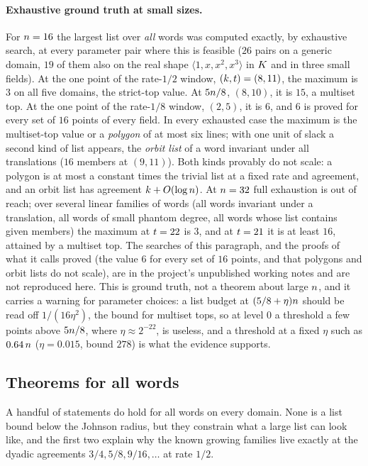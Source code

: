 \paragraph{Exhaustive ground truth at small sizes.} For $n=16$ the largest list over \emph{all} words was computed exactly, by exhaustive search, at every parameter pair where this is feasible ($26$ pairs on a generic domain, $19$ of them also on the real shape $\langle1,x,x^2,x^3\rangle$ in $K$ and in three small fields). At the one point of the rate-$1/2$ window, $(k,t)=(8,11)$, the maximum is $3$ on all five domains, the strict-top value. At $5n/8$, $(8,10)$, it is $15$, a multiset top. At the one point of the rate-$1/8$ window, $(2,5)$, it is $6$, and $6$ is proved for every set of $16$ points of every field. In every exhausted case the maximum is the multiset-top value or a \emph{polygon} of at most six lines; with one unit of slack a second kind of list appears, the \emph{orbit list} of a word invariant under all translations ($16$ members at $(9,11)$). Both kinds provably do not scale: a polygon is at most a constant times the trivial list at a fixed rate and agreement, and an orbit list has agreement $k+O(\log n)$. At $n=32$ full exhaustion is out of reach; over several linear families of words (all words invariant under a translation, all words of small phantom degree, all words whose list contains given members) the maximum at $t=22$ is $3$, and at $t=21$ it is at least $16$, attained by a multiset top. The searches of this paragraph, and the proofs of what it calls proved (the value $6$ for every set of $16$ points, and that polygons and orbit lists do not scale), are in the project's unpublished working notes and are not reproduced here. This is ground truth, not a theorem about large $n$, and it carries a warning for parameter choices: a list budget at $(5/8+\eta)n$ should be read off $1/(16\eta^2)$, the bound for multiset tops, so at level $0$ a threshold a few points above $5n/8$, where $\eta\approx2^{-22}$, is useless, and a threshold at a fixed $\eta$ such as $0.64\,n$ ($\eta=0.015$, bound $278$) is what the evidence supports.

\subsection{Theorems for all words}\label{sec:allwords}

A handful of statements do hold for all words on every domain. None is a list bound below the Johnson radius, but they constrain what a large list can look like, and the first two explain why the known growing families live exactly at the dyadic agreements $3/4,5/8,9/16,\dots$ at rate $1/2$.

